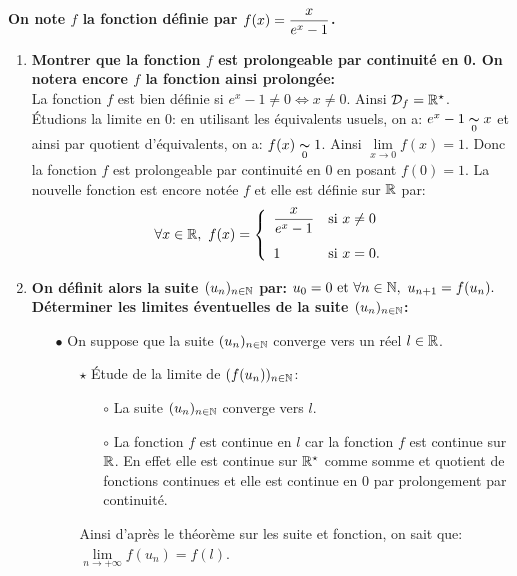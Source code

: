 \documentclass[a4paper, 11pt,reqno]{article}
\begin{document}
\begin{correction}  \;
	\noindent \textbf{On note $f$ la fonction d\'efinie par $f(x)=\displaystyle\frac{x}{e^x-1}$. }
	\begin{enumerate}
		\item \textbf{Montrer que la fonction $f$ est prolongeable par continuit\'e en 0. On notera encore $f$ la fonction ainsi prolong\'ee:}\\
		      \noindent La fonction $f$ est bien d\'efinie si $e^x-1\not= 0\Leftrightarrow x\not=0$. Ainsi $\mathcal{D}_f=\mathbb{R}^{\star}$. \\
		      \noindent \'Etudions la limite en 0: en utilisant les \'equivalents usuels, on a: $e^x-1\underset{0}{\thicksim} x$ et ainsi par quotient d'\'equivalents, on a: $f(x)\underset{0}{\thicksim} 1$. Ainsi $\lim\limits_{x\to 0} f(x)=1$. Donc la fonction $f$ est prolongeable par continuit\'e en 0 en posant $f(0)=1$. La nouvelle fonction est encore not\'ee $f$ et elle est d\'efinie sur $\mathbb{R}$ par:
		      $$\forall x\in\R,\ f(x)=\left\lbrace \begin{array}{ll}
				      \ddp\frac{x}{e^x-1} & \hbox{si}\ x\not= 0\vsec \\
				      1                   & \hbox{si}\ x=0.
			      \end{array}\right.
		      $$
		\item \textbf{On d\'efinit alors la suite $(u_n)_{n\in \mathbb{N}}$ par: $u_0=0\ \hbox{et}\ \forall n\in\N,\ u_{n+1}=f(u_n).$}
		      \textbf{D\'eterminer les limites \'eventuelles de la suite $(u_n)_{n\in \mathbb{N}}$:}
		      \begin{itemize}
			      \item[$\bullet$] On suppose que la suite $(u_n)_{n\in \mathbb{N}}$ converge vers un r\'eel $l\in\mathbb{R}$.
			            \begin{itemize}
				            \item[$\star$] \'Etude de la limite de $(f(u_n))_{n\in\mathbb{N}}$:
				                  \begin{itemize}
					                  \item[$\circ$] La suite $(u_n)_{n\in \mathbb{N}}$ converge vers $l$.
					                  \item[$\circ$] La fonction $f$ est continue en $l$ car la fonction $f$ est continue sur $\mathbb{R}$. En effet elle est continue sur $\mathbb{R}^{\star}$ comme somme et quotient de fonctions continues et elle est continue en 0 par prolongement par continuit\'e.
				                  \end{itemize}
				                  Ainsi d'apr\`{e}s le th\'eor\`{e}me sur les suite et fonction, on sait que: $\lim\limits_{n\to +\infty} f(u_n)=f(l)$.

\end{itemize}
\end{itemize}
\end{enumerate}
\end{correction}
\end{document}
